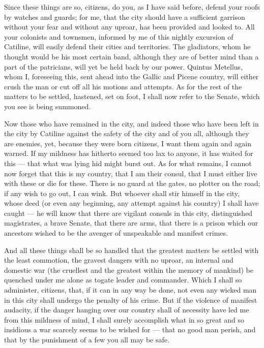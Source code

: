  Since these things are so, citizens, do you, as I have said before, defend your roofs by watches and guards; for me, that the city should have a sufficient garrison without your fear and without any uproar, has been provided and looked to. All your colonists and townsmen, informed by me of this nightly excursion of Catiline, will easily defend their cities and territories. The gladiators, whom he thought would be his most certain band, although they are of better mind than a part of the patricians, will yet be held back by our power. Quintus Metellus, whom I, foreseeing this, sent ahead into the Gallic and Picene country, will either crush the man or cut off all his motions and attempts. As for the rest of the matters to be settled, hastened, set on foot, I shall now refer to the Senate, which you see is being summoned.

 Now those who have remained in the city, and indeed those who have been left in the city by Catiline against the safety of the city and of you all, although they are enemies, yet, because they were born citizens, I want them again and again warned. If my mildness has hitherto seemed too lax to anyone, it has waited for this --- that what was lying hid might burst out. As for what remains, I cannot now forget that this is my country, that I am their consul, that I must either live with these or die for these. There is no guard at the gates, no plotter on the road; if any wish to go out, I can wink. But whoever shall stir himself in the city, whose deed (or even any beginning, any attempt against his country) I shall have caught --- he will know that there are vigilant consuls in this city, distinguished magistrates, a brave Senate, that there are arms, that there is a prison which our ancestors wished to be the avenger of unspeakable and manifest crimes.

 And all these things shall be so handled that the greatest matters be settled with the least commotion, the gravest dangers with no uproar, an internal and domestic war (the cruellest and the greatest within the memory of mankind) be quenched under me alone as togate leader and commander. Which I shall so administer, citizens, that, if it can in any way be done, not even any wicked man in this city shall undergo the penalty of his crime. But if the violence of manifest audacity, if the danger hanging over our country shall of necessity have led me from this mildness of mind, I shall surely accomplish what in so great and so insidious a war scarcely seems to be wished for --- that no good man perish, and that by the punishment of a few you all may be safe.

